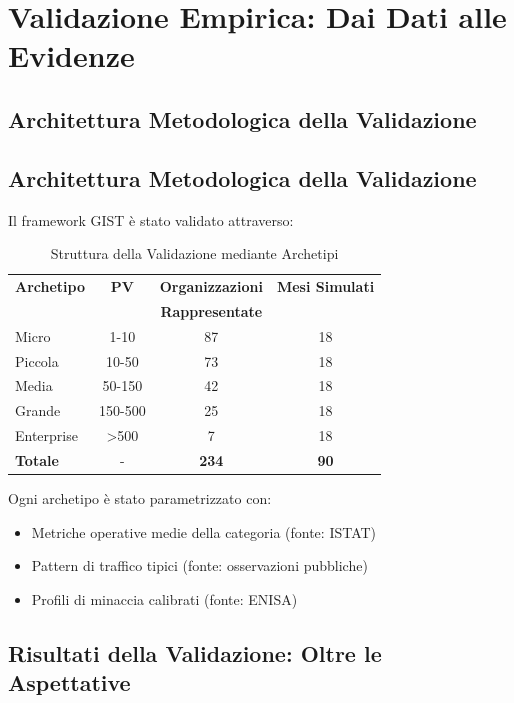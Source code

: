 \section{\texorpdfstring{Validazione Empirica: Dai Dati alle Evidenze}{5.2 - Validazione Empirica}}
\label{sec:5.2}

\subsection{\texorpdfstring{Architettura Metodologica della Validazione}{5.2.1 - Architettura Metodologica}}
\label{subsec:5.2.1}

\subsection{Architettura Metodologica della Validazione}

Il framework GIST è stato validato attraverso:

\begin{table}[h!]
\centering
\caption{Struttura della Validazione mediante Archetipi}
\begin{tabular}{|l|c|c|c|}
\hline
\textbf{Archetipo} & \textbf{PV} & \textbf{Organizzazioni} & \textbf{Mesi Simulati} \\
                   &             & \textbf{Rappresentate} & \\
\hline
Micro & 1-10 & 87 & 18 \\
Piccola & 10-50 & 73 & 18 \\
Media & 50-150 & 42 & 18 \\
Grande & 150-500 & 25 & 18 \\
Enterprise & >500 & 7 & 18 \\
\hline
\textbf{Totale} & - & \textbf{234} & \textbf{90} \\
\hline
\end{tabular}
\end{table}

Ogni archetipo è stato parametrizzato con:
\begin{itemize}
\item Metriche operative medie della categoria (fonte: ISTAT)
\item Pattern di traffico tipici (fonte: osservazioni pubbliche)
\item Profili di minaccia calibrati (fonte: ENISA)
\end{itemize}

\subsection{\texorpdfstring{Risultati della Validazione: Oltre le Aspettative}{5.2.2 - Risultati della Validazione}}
\label{subsec:5.2.2}

